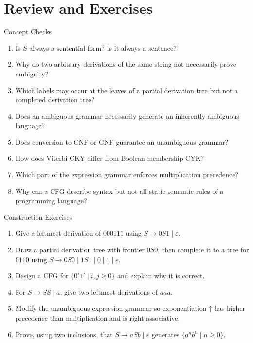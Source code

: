 \documentclass[10pt]{beamer}
\begin{document}
\section{Review and Exercises}

\begin{frame}{Concept Checks}
  \small
  \begin{enumerate}
    \item Is $S$ always a sentential form? Is it always a sentence?
    \item Why do two arbitrary derivations of the same string not necessarily prove ambiguity?
    \item Which labels may occur at the leaves of a partial derivation tree but
      not a completed derivation tree?
    \item Does an ambiguous grammar necessarily generate an inherently ambiguous language?
    \item Does conversion to CNF or GNF guarantee an unambiguous grammar?
    \item How does Viterbi CKY differ from Boolean membership CYK?
    \item Which part of the expression grammar enforces multiplication precedence?
    \item Why can a CFG describe syntax but not all static semantic rules of a programming language?
  \end{enumerate}
\end{frame}

\begin{frame}{Construction Exercises}
  \small
  \begin{enumerate}
    \item Give a leftmost derivation of $000111$ using $S\to0S1\mid\varepsilon$.
    \item Draw a partial derivation tree with frontier $0S0$, then complete it
      to a tree for $0110$ using
      $S\to0S0\mid1S1\mid0\mid1\mid\varepsilon$.
    \item Design a CFG for $\{0^i1^j\mid i,j\ge0\}$ and explain why it is correct.
    \item For $S\to SS\mid a$, give two leftmost derivations of $aaa$.
    \item Modify the unambiguous expression grammar so exponentiation $\mathbin{\uparrow}$ has higher
      precedence than multiplication and is right-associative.
    \item Prove, using two inclusions, that $S\to aSb\mid\varepsilon$ generates
      $\{a^n b^n\mid n\ge0\}$.
  \end{enumerate}
\end{frame}
\end{document}
